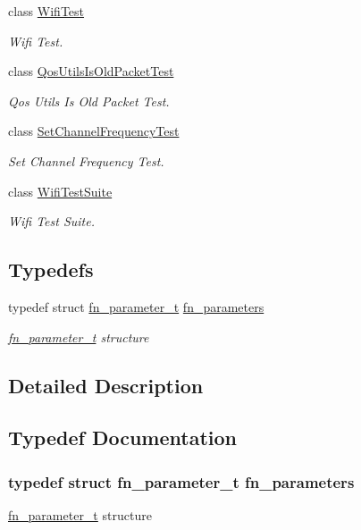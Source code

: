 \begin{DoxyCompactItemize}
class \hyperlink{classWifiTest}{Wifi\+Test}
\begin{DoxyCompactList}\small\item\em Wifi Test. \end{DoxyCompactList}\item 
class \hyperlink{classQosUtilsIsOldPacketTest}{Qos\+Utils\+Is\+Old\+Packet\+Test}
\begin{DoxyCompactList}\small\item\em Qos Utils Is Old Packet Test. \end{DoxyCompactList}\item 
class \hyperlink{classSetChannelFrequencyTest}{Set\+Channel\+Frequency\+Test}
\begin{DoxyCompactList}\small\item\em Set Channel Frequency Test. \end{DoxyCompactList}\item 
class \hyperlink{classWifiTestSuite}{Wifi\+Test\+Suite}
\begin{DoxyCompactList}\small\item\em Wifi Test Suite. \end{DoxyCompactList}\end{DoxyCompactItemize}
\subsection*{Typedefs}
\begin{DoxyCompactItemize}
\item 
typedef struct \hyperlink{structfn__parameter__t}{fn\+\_\+parameter\+\_\+t} \hyperlink{group__wifi-test_ga9686eb7a02b1520501edaf7c6be7157d}{fn\+\_\+parameters}
\begin{DoxyCompactList}\small\item\em \hyperlink{structfn__parameter__t}{fn\+\_\+parameter\+\_\+t} structure \end{DoxyCompactList}\end{DoxyCompactItemize}


\subsection{Detailed Description}


\subsection{Typedef Documentation}
\subsubsection[{\texorpdfstring{fn\+\_\+parameters}{fn_parameters}}]{\setlength{\rightskip}{0pt plus 5cm}typedef struct {\bf fn\+\_\+parameter\+\_\+t}  {\bf fn\+\_\+parameters}}\hypertarget{group__wifi-test_ga9686eb7a02b1520501edaf7c6be7157d}{}\label{group__wifi-test_ga9686eb7a02b1520501edaf7c6be7157d}


\hyperlink{structfn__parameter__t}{fn\+\_\+parameter\+\_\+t} structure 

